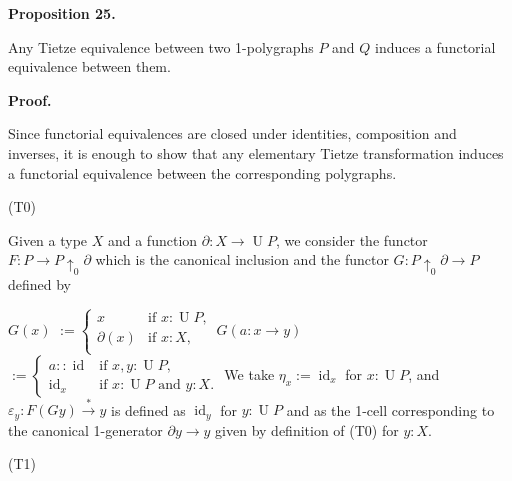  
\par\medskip\noindent\textbf{Proposition 25.}\par
 
 
Any Tietze equivalence between two 1-polygraphs $P$ and $Q$ induces a functorial equivalence between them.\par
 
 
 
 
 
\par\medskip\noindent\textbf{Proof.}\par
 
 
Since functorial equivalences are closed under identities, composition and inverses, it is enough to show that any elementary Tietze transformation induces a functorial equivalence between the corresponding polygraphs.\par
  (T0)  
 
Given a type $X$ and a function $\partial:X\to\operatorname{U}P$, we consider the functor $F:P\to P{\uparrow_{0}}\partial$ which is the canonical inclusion and the functor $G:P{\uparrow_{0}}\partial\to P$ defined by\par
    $\displaystyle G(x)$ $\displaystyle:=\begin{cases}x&\text{if $x:\operatorname{U}P$,}\\
\partial(x)&\text{if $x:X$,}\\
\end{cases}$ $\displaystyle G(a:x\to y)$ $\displaystyle:=\begin{cases}a::\operatorname{id}&\text{if $x,y:\operatorname{U}P$,}\\
\operatorname{id}_{x}&\text{if $x:\operatorname{U}P$ and $y:X$.}\end{cases}$    
We take $\eta_{x}:=\operatorname{id}_{x}$ for $x:\operatorname{U}P$, and $\varepsilon_{y}:F(Gy)\overset{*}{\to}y$ is defined as $\operatorname{id}_{y}$ for $y:\operatorname{U}P$ and as the 1-cell corresponding to the canonical 1-generator $\partial y\to y$ given by definition of (T0) for $y:X$.\par
 
  (T1)  
 
